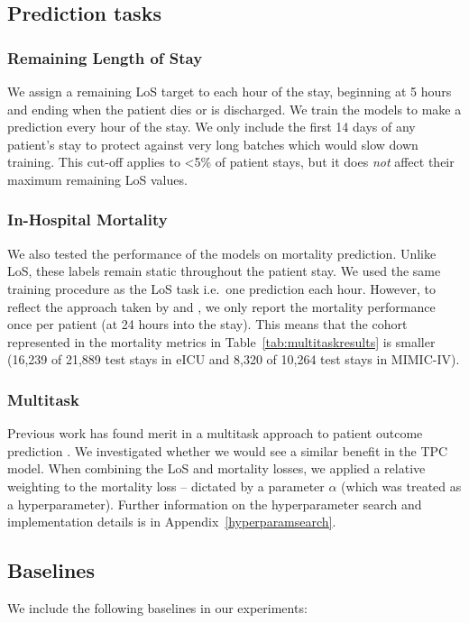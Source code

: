 \documentclass[sigconf]{acmart}
\begin{document}
\subsection{Prediction tasks}
\subsubsection{Remaining Length of Stay}
We assign a remaining LoS target to each hour of the stay, beginning at 5 hours and ending when the patient dies or is discharged. We train the models to make a prediction every hour of the stay. We only include the first 14 days of any patient's stay to protect against very long batches which would slow down training. This cut-off applies to <5\% of patient stays, but it does \textit{not} affect their maximum remaining LoS values.

\subsubsection{In-Hospital Mortality}
We also tested the performance of the models on mortality prediction. Unlike LoS, these labels remain static throughout the patient stay. We used the same training procedure as the LoS task i.e.\ one prediction each hour. However, to reflect the approach taken by \citet{purushotham2017benchmark} and \citet{harutyunyan}, we only report the mortality performance once per patient (at 24 hours into the stay). This means that the cohort represented in the mortality metrics in Table~\ref{tab:multitaskresults} is smaller (16,239 of 21,889 test stays in eICU and 8,320 of 10,264 test stays in MIMIC-IV).

\subsubsection{Multitask}
Previous work has found merit in a multitask approach to patient outcome prediction \citep{harutyunyan, sheikhalishahi2019benchmarking}. We investigated whether we would see a similar benefit in the TPC model. When combining the LoS and mortality losses, we applied a relative weighting to the mortality loss -- dictated by a parameter $\alpha$ (which was treated as a hyperparameter). Further information on the hyperparameter search and implementation details is in Appendix~\ref{hyperparamsearch}.

\subsection{Baselines}
\label{baselines}
We include the following baselines in our experiments:
\end{document}
